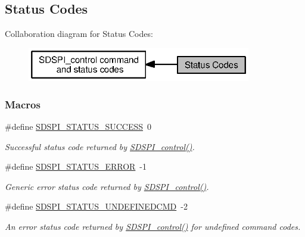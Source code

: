 \subsection{Status Codes}
\label{group___s_d_s_p_i___s_t_a_t_u_s}
Collaboration diagram for Status Codes\+:
\nopagebreak
\begin{figure}[H]
\begin{center}
\leavevmode
\includegraphics[width=277pt]{group___s_d_s_p_i___s_t_a_t_u_s}
\end{center}
\end{figure}
\subsubsection*{Macros}
\begin{DoxyCompactItemize}
\item 
\#define \hyperlink{group___s_d_s_p_i___s_t_a_t_u_s_ga5ebecb6ddc00b47b11c1d5ab3ce04108}{S\+D\+S\+P\+I\+\_\+\+S\+T\+A\+T\+U\+S\+\_\+\+S\+U\+C\+C\+E\+S\+S}~0
\begin{DoxyCompactList}\small\item\em Successful status code returned by \hyperlink{_s_d_s_p_i_8h_a541a1db109382fe090ed7a9209a34f61}{S\+D\+S\+P\+I\+\_\+control()}. \end{DoxyCompactList}\item 
\#define \hyperlink{group___s_d_s_p_i___s_t_a_t_u_s_ga61e58103fc719d0afafddfc7dd11b49d}{S\+D\+S\+P\+I\+\_\+\+S\+T\+A\+T\+U\+S\+\_\+\+E\+R\+R\+O\+R}~-\/1
\begin{DoxyCompactList}\small\item\em Generic error status code returned by \hyperlink{_s_d_s_p_i_8h_a541a1db109382fe090ed7a9209a34f61}{S\+D\+S\+P\+I\+\_\+control()}. \end{DoxyCompactList}\item 
\#define \hyperlink{group___s_d_s_p_i___s_t_a_t_u_s_gaf65a39f487c0da299c3e0fc77a70a4c3}{S\+D\+S\+P\+I\+\_\+\+S\+T\+A\+T\+U\+S\+\_\+\+U\+N\+D\+E\+F\+I\+N\+E\+D\+C\+M\+D}~-\/2
\begin{DoxyCompactList}\small\item\em An error status code returned by \hyperlink{_s_d_s_p_i_8h_a541a1db109382fe090ed7a9209a34f61}{S\+D\+S\+P\+I\+\_\+control()} for undefined command codes. \end{DoxyCompactList}\end{DoxyCompactItemize}


